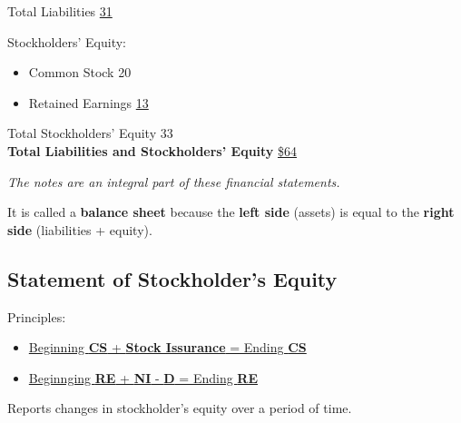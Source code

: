 \begin{tcolorbox}[colframe=black,colback=white,title=Example Balance Sheet (Classified by Current \& Non-current)]
\begin{multicols}{2}
        Total Liabilities \hfill \underline{31}

        Stockholders' Equity:
        \begin{itemize}
            \item Common Stock \hfill 20
            \item Retained Earnings \hfill \underline{13}
        \end{itemize}
        Total Stockholders' Equity \hfill 33\\
        {\textbf{Total Liabilities and Stockholders' Equity}} \hfill \underline{\underline{\$64}}
    \end{multicols}

    \vspace{1em}

    \textit{\footnotesize{The notes are an integral part of these financial statements.}}
\end{tcolorbox}

\normalsize

It is called a \textbf{balance sheet} because the \textbf{left side} (assets) is equal to the \textbf{right side} (liabilities + equity).

\newpage

\subsection{Statement of Stockholder's Equity}
\label{sec:statement_se}

Principles:

\begin{itemize}
    \item \hyperref[def:cs]{Beginning \textbf{CS} + \textbf{Stock Issurance} = Ending \textbf{CS}}
    \item \hyperref[thm:relations]{Beginnging \textbf{RE} + \textbf{NI} - \textbf{D} = Ending \textbf{RE}}
\end{itemize}


Reports changes in stockholder's equity over a period of time.

\small


